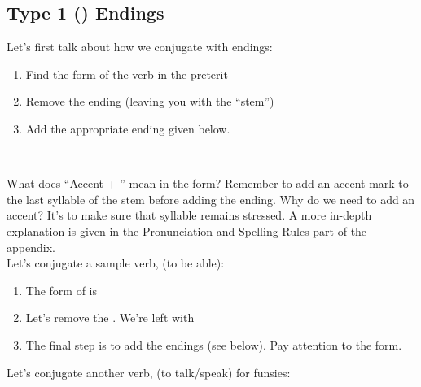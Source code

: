 \subsection{Type 1 () Endings}
Let's first talk about how we conjugate with  endings: 
\begin{enumerate}[noitemsep]
	\item Find the  form of the verb in the preterit
	\item Remove the  ending (leaving you with the ``stem'')
	\item Add the appropriate ending given below. 
\end{enumerate}
\



What does ``Accent + '' mean in the  form? Remember to add an accent mark to the last syllable of the stem before adding the ending. Why do we need to add an accent? It's to make sure that syllable remains stressed. A more in-depth explanation is given in the \hyperref[subsec:pronun]{Pronunciation and Spelling Rules} part of the appendix. \\

Let's conjugate a sample verb,  (to be able):
\begin{enumerate}[noitemsep]
	\item The  form of  is 
	\item Let's remove the . We're left with 
	\item The final step is to add the endings (see below). Pay attention to the  form. 
\end{enumerate}



Let's conjugate another verb,  (to talk/speak) for funsies: 

